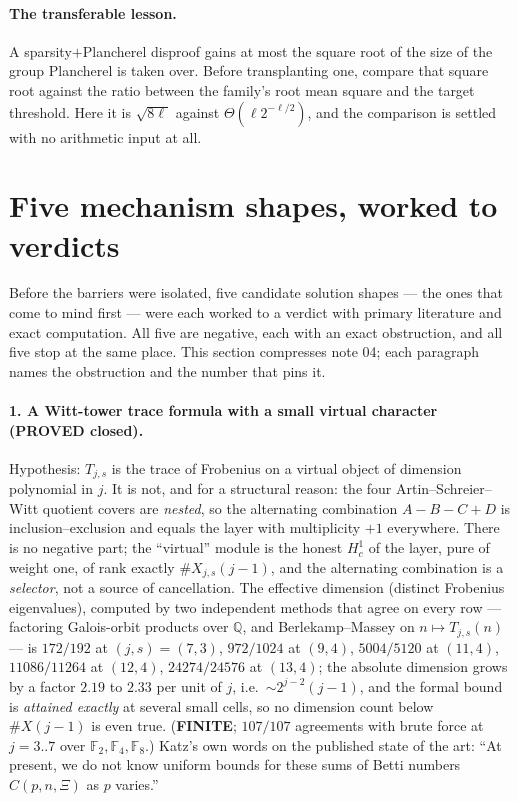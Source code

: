 \documentclass[10pt]{article}
\theoremstyle{plain}
\theoremstyle{definition}
\newcommand{\F}{\mathbb F}
\newcommand{\Q}{\mathbb Q}
\newcommand{\proved}{\textcolor{proved}{\textsf{\textbf{\footnotesize PROVED}}}}
\newcommand{\finite}{\textcolor{finite}{\textsf{\textbf{\footnotesize FINITE}}}}
\begin{document}
\paragraph{The transferable lesson.} A sparsity$+$Plancherel disproof gains at
most the square root of the size of the group Plancherel is taken over. Before
transplanting one, compare that square root against the ratio between the
family's root mean square and the target threshold. Here it is $\sqrt{8\ell}$
against $\Theta(\ell2^{-\ell/2})$, and the comparison is settled with no
arithmetic input at all.
\section{Five mechanism shapes, worked to verdicts}\label{sec:shapes}

Before the barriers were isolated, five candidate solution shapes --- the ones
that come to mind first --- were each worked to a verdict with primary
literature and exact computation. All five are negative, each with an exact
obstruction, and all five stop at the same place. This section compresses note
04; each paragraph names the obstruction and the number that pins it.

\paragraph{1. A Witt-tower trace formula with a small virtual character
(\proved{} closed).} Hypothesis: $T_{j,s}$ is the trace of Frobenius on a
virtual object of dimension polynomial in $j$. It is not, and for a structural
reason: the four Artin--Schreier--Witt quotient covers are \emph{nested}, so the
alternating combination $A-B-C+D$ is inclusion--exclusion and equals the layer
with multiplicity $+1$ everywhere. There is no negative part; the ``virtual''
module is the honest $H^1_c$ of the layer, pure of weight one, of rank exactly
$\#X_{j,s}(j-1)$, and the alternating combination is a \emph{selector}, not a
source of cancellation. The effective dimension (distinct Frobenius
eigenvalues), computed by two independent methods that agree on every row ---
factoring Galois-orbit products over $\Q$, and Berlekamp--Massey on
$n\mapsto T_{j,s}(n)$ --- is $172/192$ at $(j,s)=(7,3)$, $972/1024$ at $(9,4)$,
$5004/5120$ at $(11,4)$, $11086/11264$ at $(12,4)$, $24274/24576$ at $(13,4)$;
the absolute dimension grows by a factor $2.19$ to $2.33$ per unit of $j$, i.e.\
$\sim2^{j-2}(j-1)$, and the formal bound is \emph{attained exactly} at several
small cells, so no dimension count below $\#X(j-1)$ is even true. (\finite;
$107/107$ agreements with brute force at $j=3..7$ over $\F_2,\F_4,\F_8$.)
Katz's own words on the published state of the art: ``At present, we do not
know uniform bounds for these sums of Betti numbers $C(p,n,\Xi)$ as $p$
varies.''
\end{document}
